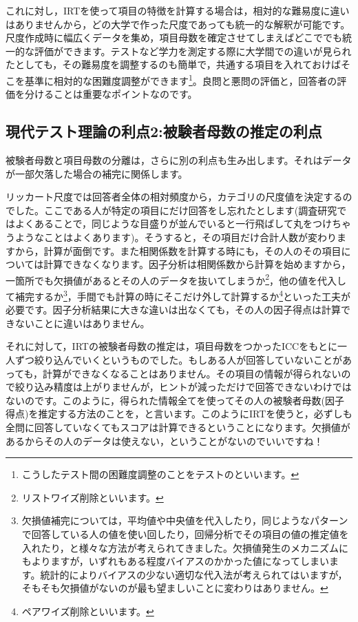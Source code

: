 \documentclass{ltjsbook}
\begin{document}
これに対し，IRTを使って項目の特徴を計算する場合は，相対的な難易度に違いはありませんから，どの大学で作った尺度であっても統一的な解釈が可能です。尺度作成時に幅広くデータを集め，項目母数を確定させてしまえばどこででも統一的な評価ができます。テストなど学力を測定する際に大学間での違いが見られたとしても，その難易度を調整するのも簡単で，共通する項目を入れておけばそこを基準に相対的な困難度調整ができます\footnote{こうしたテスト間の困難度調整のことをテストのといいます。}。良問と悪問の評価と，回答者の評価を分けることは重要なポイントなのです。
\subsection{現代テスト理論の利点2:被験者母数の推定の利点}
被験者母数と項目母数の分離は，さらに別の利点も生み出します。それはデータが一部欠落した場合の補完に関係します。

リッカート尺度では回答者全体の相対頻度から，カテゴリの尺度値を決定するのでした。ここである人が特定の項目にだけ回答をし忘れたとします(調査研究ではよくあることで，同じような目盛りが並んでいると一行飛ばして丸をつけちゃうようなことはよくあります)。そうすると，その項目だけ合計人数が変わりますから，計算が面倒です。また相関係数を計算する時にも，その人のその項目については計算できなくなります。因子分析は相関係数から計算を始めますから，一箇所でも欠損値があるとその人のデータを抜いてしまうか\footnote{リストワイズ削除といいます。}，他の値を代入して補完するか\footnote{欠損値補完については，平均値や中央値を代入したり，同じようなパターンで回答している人の値を使い回したり，回帰分析でその項目の値の推定値を入れたり，と様々な方法が考えられてきました。欠損値発生のメカニズムにもよりますが，いずれもある程度バイアスのかかった値になってしまいます。統計的によりバイアスの少ない適切な代入法が考えられてはいますが，そもそも欠損値がないのが最も望ましいことに変わりはありません。}，手間でも計算の時にそこだけ外して計算するか\footnote{ペアワイズ削除といいます。}といった工夫が必要です。因子分析結果に大きな違いは出なくても，その人の因子得点は計算できないことに違いはありません。

それに対して，IRTの被験者母数の推定は，項目母数をつかったICCをもとに一人ずつ絞り込んでいくというものでした。もしある人が回答していないことがあっても，計算ができなくなることはありません。その項目の情報が得られないので絞り込み精度は上がりませんが，ヒントが減っただけで回答できないわけではないのです。このように，得られた情報全てを使ってその人の被験者母数(因子得点)を推定する方法のことを，と言います。このようにIRTを使うと，必ずしも全問に回答していなくてもスコアは計算できるということになります。欠損値があるからその人のデータは使えない，ということがないのでいいですね！
\end{document}
